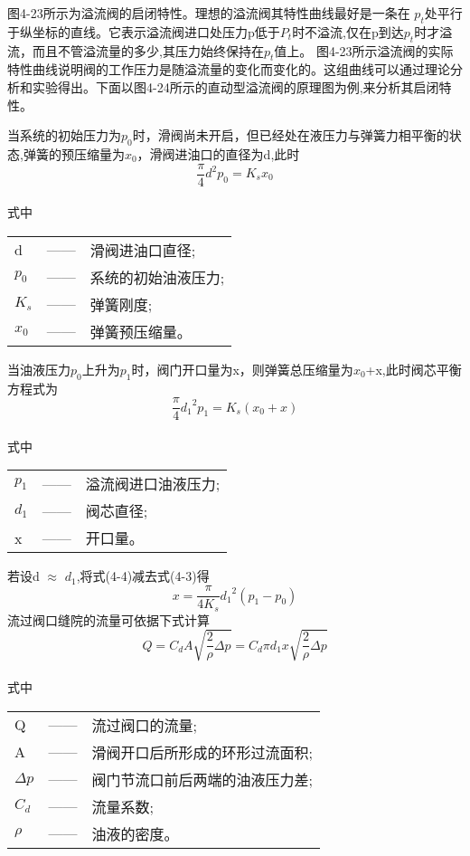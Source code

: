 \par 图4-23所示为溢流阀的启闭特性。理想的溢流阀其特性曲线最好是一条在 $p_t$处平行于纵坐标的直线。它表示溢流阀进口处压力p低于$P_t$时不溢流,仅在p到达$p_t$时才溢流，而且不管溢流量的多少,其压力始终保持在$p_t$值上。
图4-23所示溢流阀的实际特性曲线说明阀的工作压力是随溢流量的变化而变化的。这组曲线可以通过理论分析和实验得出。下面以图4-24所示的直动型溢流阀的原理图为例,来分析其启闭特性。
\par 当系统的初始压力为$p_0$时，滑阀尚未开启，但已经处在液压力与弹簧力相平衡的状态,弹簧的预压缩量为$x_0$，滑阀进油口的直径为d,此时
\begin{equation}
   \frac{\pi}{4}d^2p_0=K_sx_0
\end{equation}
\\式中\ 
\begin{tabular}[t]{lp{8mm}l}
   d &—— &滑阀进油口直径;\\
   $p_{0}$ &—— & 系统的初始油液压力;\\
   $K_s$ &——&弹簧刚度;\\
  $x_0$&——&弹簧预压缩量。\\
\end{tabular}
\par 当油液压力$p_0$上升为$p_1$时，阀门开口量为x，则弹簧总压缩量为$x_0$+x,此时阀芯平衡方程式为
\begin{equation}
   \frac{\pi}{4}{d_1}^2p_1=K_s(x_0+x)
\end{equation}
\\式中\ 
\begin{tabular}[t]{lp{8mm}l}
   $p_{1}$ &—— &溢流阀进口油液压力;\\
   $d_{1}$ &—— & 阀芯直径;\\
   x &——&开口量。\\
\end{tabular}
\par  若设d $\approx$ $d_1$,将式(4-4)减去式(4-3)得
\begin{equation}
   x=\frac{\pi}{4K_s}{d_1}^2(p_1-p_0)
\end{equation}
\qquad 流过阀口缝院的流量可依据下式计算 %
\begin{equation}
      Q=C_dA\sqrt{\frac{2}{\rho}\Delta p}=C_d\pi d_1x\sqrt{\frac{2}{\rho}\Delta p}
   \end{equation}
      \\式中\ 
\begin{tabular}[t]{lp{8mm}l}
   Q &—— &流过阀口的流量;\\
   A &—— & 滑阀开口后所形成的环形过流面积;\\
   $\Delta p$ &——&阀门节流口前后两端的油液压力差;\\
   $C_d$ &——&流量系数;\\
   $\rho $ &——&油液的密度。\\
\end{tabular}
